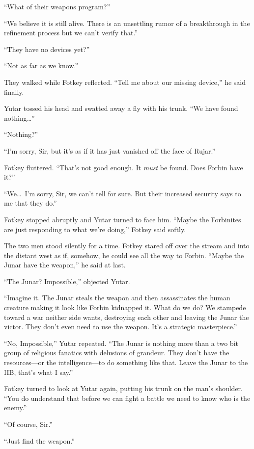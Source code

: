 ``What of their weapons program?''

``We believe it is still alive. There is an unsettling rumor of a breakthrough in the refinement
process but we can't verify that.''

``They have no devices yet?''

``Not as far as we know.''

They walked while Fotkey reflected. ``Tell me about our missing device,'' he said finally.

Yutar tossed his head and swatted away a fly with his trunk. ``We have found nothing\ldots''

``Nothing?''

``I'm sorry, Sir, but it's as if it has just vanished off the face of Rujar.''

Fotkey fluttered. ``That's not good enough. It \emph{must} be found. Does Forbin have it?''

``We\ldots\ I'm sorry, Sir, we can't tell for sure. But their increased security says to me that
they do.''

Fotkey stopped abruptly and Yutar turned to face him. ``Maybe the Forbinites are just
responding to what we're doing,'' Fotkey said softly.

The two men stood silently for a time. Fotkey stared off over the stream and into the distant
west as if, somehow, he could see all the way to Forbin. ``Maybe the Junar have the weapon,'' he
said at last.

``The Junar? Impossible,'' objected Yutar.

``Imagine it. The Junar steals the weapon and then assassinates the human creature making it
look like Forbin kidnapped it. What do we do? We stampede toward a war neither side wants,
destroying each other and leaving the Junar the victor. They don't even need to use the weapon.
It's a strategic masterpiece.''

``No, Impossible,'' Yutar repeated. ``The Junar is nothing more than a two bit group of
religious fanatics with delusions of grandeur. They don't have the resources---or the
intelligence---to do something like that. Leave the Junar to the IIB, that's what I say.''

Fotkey turned to look at Yutar again, putting his trunk on the man's shoulder. ``You do
understand that before we can fight a battle we need to know who is the enemy.''

``Of course, Sir.''

``Just find the weapon.''
